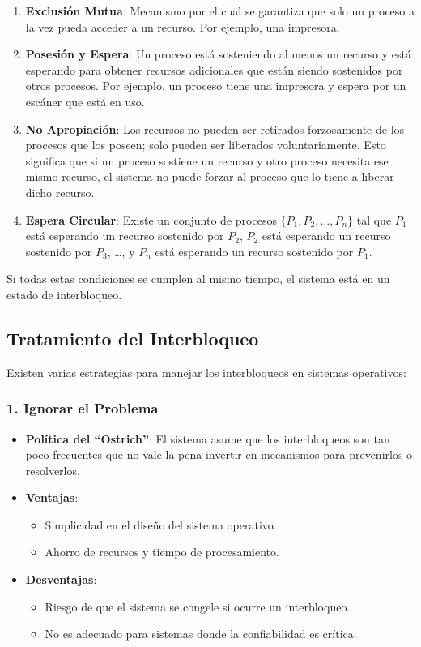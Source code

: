 \begin{enumerate}
	\item \textbf{Exclusión Mutua}: Mecanismo por el cual se garantiza que solo un proceso a la vez pueda acceder a un recurso. Por ejemplo, una impresora.
	\item \textbf{Posesión y Espera}: Un proceso está sosteniendo al menos un recurso y está esperando para obtener recursos adicionales que están siendo sostenidos por otros procesos. Por ejemplo, un proceso tiene una impresora y espera por un escáner que está en uso.
	\item \textbf{No Apropiación}: Los recursos no pueden ser retirados forzosamente de los procesos que los poseen; solo pueden ser liberados voluntariamente. Esto significa que si un proceso sostiene un recurso y otro proceso necesita ese mismo recurso, el sistema no puede forzar al proceso que lo tiene a liberar dicho recurso. 
	\item \textbf{Espera Circular}: Existe un conjunto de procesos \(\{P_1, P_2, \ldots, P_n\}\) tal que \(P_1\) está esperando un recurso sostenido por \(P_2\), \(P_2\) está esperando un recurso sostenido por \(P_3\), \ldots, y \(P_n\) está esperando un recurso sostenido por \(P_1\).
\end{enumerate}

Si todas estas condiciones se cumplen al mismo tiempo, el sistema está en un estado de interbloqueo.

\subsection{Tratamiento del Interbloqueo}

Existen varias estrategias para manejar los interbloqueos en sistemas operativos:

\subsubsection{1. Ignorar el Problema}

\begin{itemize}
	\item \textbf{Política del ``Ostrich''}: El sistema asume que los interbloqueos son tan poco frecuentes que no vale la pena invertir en mecanismos para prevenirlos o resolverlos.
	\item \textbf{Ventajas}:
	\begin{itemize}
		\item Simplicidad en el diseño del sistema operativo.
		\item Ahorro de recursos y tiempo de procesamiento.
	\end{itemize}
	\item \textbf{Desventajas}:
	\begin{itemize}
		\item Riesgo de que el sistema se congele si ocurre un interbloqueo.
		\item No es adecuado para sistemas donde la confiabilidad es crítica.
	\end{itemize}
\end{itemize}

